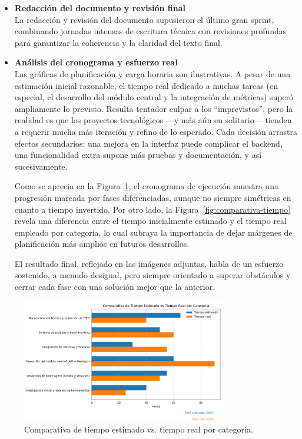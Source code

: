 \documentclass[11pt,a4paper,twoside]{report}
\begin{document}
\begin{itemize}
	\item \textbf{Redacción del documento y revisión final}\\
	\hspace*{1em}La redacción y revisión del documento supusieron el último gran sprint, combinando jornadas intensas de escritura técnica con revisiones profundas para garantizar la coherencia y la claridad del texto final.
	
	\item \textbf{Análisis del cronograma y esfuerzo real}\\
	\hspace*{1em}Las gráficas de planificación y carga horaria son ilustrativas. A pesar de una estimación inicial razonable, el tiempo real dedicado a muchas tareas (en especial, el desarrollo del módulo central y la integración de métricas) superó ampliamente lo previsto. Resulta tentador culpar a los “imprevistos”, pero la realidad es que los proyectos tecnológicos —y más aún en solitario— tienden a requerir mucha más iteración y refino de lo esperado. Cada decisión arrastra efectos secundarios: una mejora en la interfaz puede complicar el backend, una funcionalidad extra supone más pruebas y documentación, y así sucesivamente.
	
	\hspace*{1em}Como se aprecia en la Figura~\ref{fig:cronograma}, el cronograma de ejecución muestra una progresión marcada por fases diferenciadas, aunque no siempre simétricas en cuanto a tiempo invertido. Por otro lado, la Figura~\ref{fig:comparativa-tiempo} revela una diferencia entre el tiempo inicialmente estimado y el tiempo real empleado por categoría, lo cual subraya la importancia de dejar márgenes de planificación más amplios en futuros desarrollos.
	
	\hspace*{1em}El resultado final, reflejado en las imágenes adjuntas, habla de un esfuerzo sostenido, a menudo desigual, pero siempre orientado a superar obstáculos y cerrar cada fase con una solución mejor que la anterior.
\end{itemize}

\begin{figure}[H]
	\centering
	\includegraphics[width=0.8\textwidth]{cronologia/1.png}
	\caption{Comparativa de tiempo estimado vs. tiempo real por categoría.}
	\label{fig:cronograma}
\end{figure}
\end{document}
